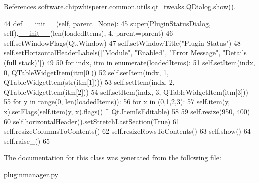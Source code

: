 References software.\+chipwhisperer.\+common.\+utils.\+qt\+\_\+tweaks.\+Q\+Dialog.\+show().


\begin{DoxyCode}
44         \textcolor{keyword}{def }\hyperlink{classsoftware_1_1chipwhisperer_1_1common_1_1utils_1_1pluginmanager_1_1Plugin_1_1PluginStatusDialog_a8bc46975d63d33b425f484c503e6e6f8}{\_\_init\_\_}(self, parent=None):
45             super(PluginStatusDialog, self).\hyperlink{classsoftware_1_1chipwhisperer_1_1common_1_1utils_1_1pluginmanager_1_1Plugin_1_1PluginStatusDialog_a8bc46975d63d33b425f484c503e6e6f8}{\_\_init\_\_}(len(loadedItems), 4, parent=parent)
46             self.setWindowFlags(Qt.Window)
47             self.setWindowTitle(\textcolor{stringliteral}{"Plugin Status"})
48             self.setHorizontalHeaderLabels([\textcolor{stringliteral}{"Module"}, \textcolor{stringliteral}{"Enabled"}, \textcolor{stringliteral}{"Error Message"}, \textcolor{stringliteral}{"Details (full stack)"}])
49 
50             \textcolor{keywordflow}{for} indx, itm \textcolor{keywordflow}{in} enumerate(loadedItems):
51                 self.setItem(indx, 0, QTableWidgetItem(itm[0]))
52                 self.setItem(indx, 1, QTableWidgetItem(str(itm[1])))
53                 self.setItem(indx, 2, QTableWidgetItem(itm[2]))
54                 self.setItem(indx, 3, QTableWidgetItem(itm[3]))
55             \textcolor{keywordflow}{for} y \textcolor{keywordflow}{in} range(0, len(loadedItems)):
56                 \textcolor{keywordflow}{for} x \textcolor{keywordflow}{in} (0,1,2,3):
57                     self.item(y, x).setFlags(self.item(y, x).flags() ^ Qt.ItemIsEditable)
58 
59             self.resize(950, 400)
60             self.horizontalHeader().setStretchLastSection(\textcolor{keyword}{True})
61             self.resizeColumnsToContents()
62             self.resizeRowsToContents()
63             self.show()
64             self.raise\_()
65 
\end{DoxyCode}


The documentation for this class was generated from the following file\+:\begin{DoxyCompactItemize}
\item 
\hyperlink{pluginmanager_8py}{pluginmanager.\+py}\end{DoxyCompactItemize}
